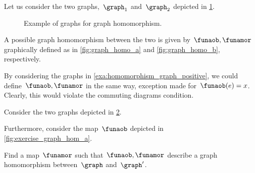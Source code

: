 \begin{example}
    \label{exa:homomorphism_graph_positive}
    Let us consider the two graphs,~$\graph_1$ and~$\graph_2$ depicted in \cref{fig:ex_graph_homom}.
    \begin{figure}[h]
        \centering
        \caption{Example of graphs for graph homomorphism.}
        \label{fig:ex_graph_homom}
    \end{figure}

    \begin{marginfigure}
        \centering
        \caption{}
        \label{fig:graph_homo_a}
    \end{marginfigure}

    \begin{marginfigure}
        \centering
        \caption{}
        \label{fig:graph_homo_b}
    \end{marginfigure}
    A possible graph homomorphism between the two is given by~$\funaob,\funamor$ graphically defined as in \cref{fig:graph_homo_a} and \cref{fig:graph_homo_b}, respectively.
\end{example}

\begin{example}[Counterexample]
    By considering the graphs in \cref{exa:homomorphism_graph_positive}, we could define~$\funaob,\funamor$ in the same way, exception made for~$\funaob(e)=x$.
    Clearly, this would violate the commuting diagrams condition.
\end{example}

\begin{exercise}
    Consider the two graphs depicted in \cref{fig:ex_graph_hom}.
    \begin{figure}[h]
        \centering
        \caption{
            \label{fig:ex_graph_hom}}
    \end{figure}
    \begin{marginfigure}
        \centering
        \caption{}
        \label{fig:exercise_graph_hom_a}
    \end{marginfigure}
    Furthermore, consider the map~$\funaob$ depicted in \cref{fig:exercise_graph_hom_a}.

    Find a map~$\funamor$ such that~$\funaob,\funamor$ describe a graph homomorphism between~$\graph$ and~$\graph'$.
\end{exercise}

